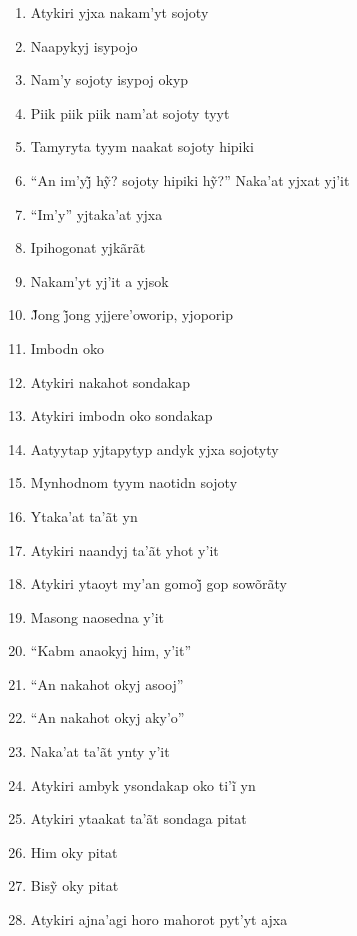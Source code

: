 \begin{enumerate}
 \item Atykiri yjxa nakam'yt sojoty
 \item Naapykyj isypojo
 \item Nam'y sojoty isypoj okyp
 \item Piik piik piik nam'at sojoty tyyt
 \item Tamyryta tyym naakat sojoty hipiki
 \item ``An im’yj̃ hỹ? sojoty hipiki hỹ?'' Naka’at yjxat yj’it
 \item ``Im'y'' yjtaka'at yjxa
 \item Ipihogonat yjkãrãt
 \item Nakam'yt yj'it a yjsok
 \item J̃ong j̃ong yjjere’oworip, yjoporip
 \item Imbodn oko
 \item Atykiri nakahot sondakap
 \item Atykiri imbodn oko sondakap
 \item Aatyytap yjtapytyp andyk yjxa sojotyty
 \item Mynhodnom tyym naotidn sojoty
 
 \begin{center}\end{center}
 
 \item Ytaka'at ta'ãt yn
 \item Atykiri naandyj ta'ãt yhot y'it
 \item Atykiri ytaoyt my’an gomoj̃ gop sowõrãty
 \item Masong naosedna y'it
 \item ``Kabm anaokyj him, y'it''
 \item ``An nakahot okyj asooj''
 \item ``An nakahot okyj aky'o''
 \item Naka'at ta'ãt ynty y'it
 
 \begin{center}\end{center}
 
 \item Atykiri ambyk ysondakap oko ti’ĩ yn
 \item Atykiri ytaakat ta'ãt sondaga pitat
 \item Him oky pitat
 \item Bisỹ oky pitat
 \item Atykiri ajna'agi horo mahorot pyt'yt ajxa
 
 \begin{center}\end{center}
 

\end{enumerate}
